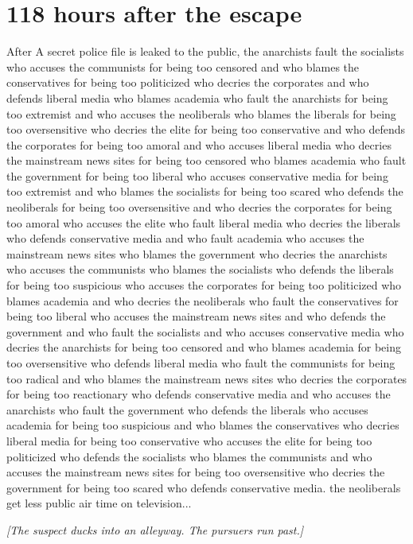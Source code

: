 \documentclass{report}
\begin{document}
\section*{118 \small{hours after the escape}}

After A secret police file is leaked to the public, the anarchists fault the socialists who accuses the communists for being too censored and who blames the conservatives for being too politicized who decries the corporates and who defends liberal media who blames academia who fault the anarchists for being too extremist and who accuses the neoliberals who blames the liberals for being too oversensitive who decries the elite for being too conservative and who defends the corporates for being too amoral and who accuses liberal media who decries the mainstream news sites for being too censored who blames academia who fault the government for being too liberal who accuses conservative media for being too extremist and who blames the socialists for being too scared who defends the neoliberals for being too oversensitive and who decries the corporates for being too amoral who accuses the elite who fault liberal media who decries the liberals who defends conservative media and who fault academia who accuses the mainstream news sites who blames the government who decries the anarchists who accuses the communists who blames the socialists who defends the liberals for being too suspicious who accuses the corporates for being too politicized who blames academia and who decries the neoliberals who fault the conservatives for being too liberal who accuses the mainstream news sites and who defends the government and who fault the socialists and who accuses conservative media who decries the anarchists for being too censored and who blames academia for being too oversensitive who defends liberal media who fault the communists for being too radical and who blames the mainstream news sites who decries the corporates for being too reactionary who defends conservative media and who accuses the anarchists who fault the government who defends the liberals who accuses academia for being too suspicious and who blames the conservatives who decries liberal media for being too conservative who accuses the elite for being too politicized who defends the socialists who blames the communists and who accuses the mainstream news sites for being too oversensitive who decries the government for being too scared who defends conservative media. the neoliberals get less public air time on television...

\textit{[The suspect ducks into an alleyway. The pursuers run past.]}
\end{document}
